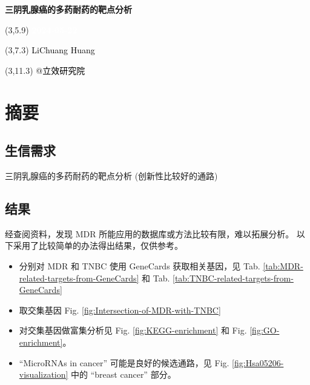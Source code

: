 \documentclass[
]{article}
\author{}
\date{\vspace{-2.5em}}
\providecommand{\tightlist}{%
  \setlength{\itemsep}{0pt}\setlength{\parskip}{0pt}}
\begin{document}
\begin{titlepage} 
\begin{center} \textbf{\Huge
三阴乳腺癌的多药耐药的靶点分析} \vspace{4em}
\begin{textblock}{10}(3,5.9) \huge
\textbf{\textcolor{white}{2024-05-22}}
\end{textblock} \begin{textblock}{10}(3,7.3)
\Large \textcolor{black}{LiChuang Huang}
\end{textblock} \begin{textblock}{10}(3,11.3)
\Large \textcolor{black}{@立效研究院}
\end{textblock} \end{center} \end{titlepage}
\restoregeometry


\tableofcontents

\listoffigures

\listoftables

\newpage


\hypertarget{abstract}{%
\section{摘要}\label{abstract}}

\hypertarget{ux751fux4fe1ux9700ux6c42}{%
\subsection{生信需求}\label{ux751fux4fe1ux9700ux6c42}}

三阴乳腺癌的多药耐药的靶点分析 (创新性比较好的通路)

\hypertarget{ux7ed3ux679c}{%
\subsection{结果}\label{ux7ed3ux679c}}

经查阅资料，发现 MDR 所能应用的数据库或方法比较有限，难以拓展分析。
以下采用了比较简单的办法得出结果，仅供参考。

\begin{itemize}
\tightlist
\item
  分别对 MDR 和 TNBC 使用 GeneCards 获取相关基因，见
  Tab. \ref{tab:MDR-related-targets-from-GeneCards} 和
  Tab. \ref{tab:TNBC-related-targets-from-GeneCards}
\item
  取交集基因 Fig. \ref{fig:Intersection-of-MDR-with-TNBC}
\item
  对交集基因做富集分析见 Fig. \ref{fig:KEGG-enrichment} 和 Fig. \ref{fig:GO-enrichment}。
\item
  ``MicroRNAs in cancer'' 可能是良好的候选通路，见 Fig. \ref{fig:Hsa05206-visualization} 中的 ``breast cancer'' 部分。
\end{itemize}
\end{document}
